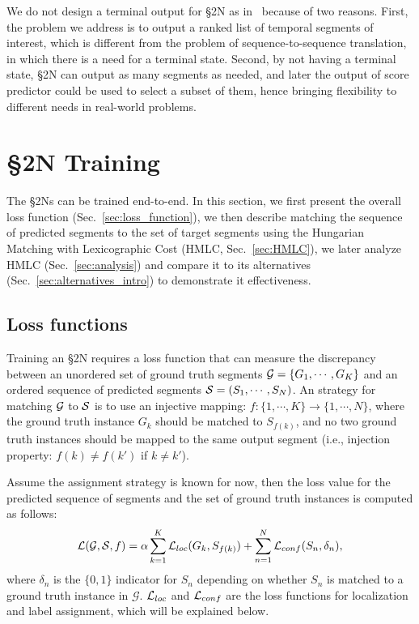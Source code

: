 \documentclass[10pt,journal,compsoc]{IEEEtran}
\begin{document}
 We do not design a terminal output for \S2N as in~\cite{bahdanau2014neural} because of two reasons. First, the problem we address is to output a ranked list of temporal segments of interest, which is different from the problem of sequence-to-sequence translation, in which there is a need for a terminal state. Second, by not having a terminal state, \S2N can output as many segments as needed, and later the output of score predictor could be used to select a subset of them, hence bringing flexibility to different needs in real-world problems. 



\section{\S2N Training} \label{sec:alignment}

The \S2Ns can be trained end-to-end. In this section, we first present the overall loss function (Sec.~\ref{sec:loss_function}), we then describe matching the sequence of predicted segments to the set of target segments using the Hungarian Matching with Lexicographic Cost (HMLC, Sec.~\ref{sec:HMLC}), we later analyze HMLC (Sec.~\ref{sec:analysis}) and compare it to its alternatives (Sec.~\ref{sec:alternatives_intro}) to demonstrate it effectiveness.

\subsection{Loss functions\label{sec:loss_function}}


Training an \S2N requires a loss function that can measure the discrepancy between an unordered set of ground truth segments $\mathcal{G}=\{G_1, \cdots, G_K\}$ and an ordered sequence of predicted segments $\mathcal{S}=(S_1, \cdots, S_N)$. An strategy for matching $\mathcal{G}$ to $\mathcal{S}$ is to use an injective mapping: $f: \{1,\cdots, K\} \rightarrow \{1, \cdots, N\}$, where the ground truth instance $G_k$ should be matched to $S_{f(k)}$, and no two ground truth instances should be mapped to the same output segment (i.e., injection property: $f(k) \neq f(k')$ if $k \neq k'$).

Assume the assignment strategy is known for now, then the loss value for the predicted sequence of segments and the set of ground truth instances is computed as follows:  
\begin{equation}
	\mL(\mG, \mS, f) = \alpha \sum_{k=1}^{K}\mL_{loc}(G_k, S_{f(k)}) + \sum_{n=1}^{N} \mL_{conf}(S_n, \delta_n),
    \label{eq:loss}
\end{equation}
where $\delta_n$ is the $\{0, 1\}$ indicator for $S_n$ depending on whether $S_n$ is matched to a ground truth instance in $\mathcal{G}$. $\mathcal{L}_{loc}$ and $\mathcal{L}_{conf}$ are the loss functions for localization and label assignment,  which will be explained below.
\end{document}
